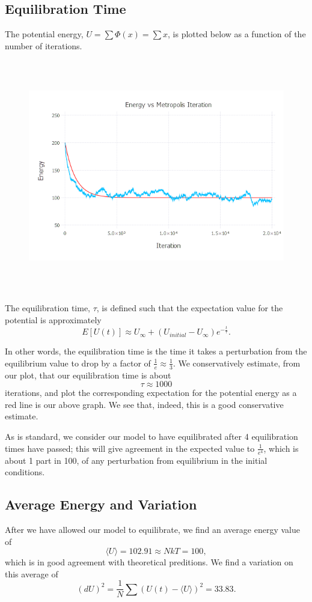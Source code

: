 \documentclass{article}
\begin{document}
\subsection{Equilibration Time}
The potential energy,
$U = \sum\Phi(x) = \sum x$, is plotted below as a function of the number of iterations.
\begin{figure}[H]
	\includegraphics[width=6in,height=4in]{"equilibration"}
\end{figure}

The equilibration time, $\tau$, is defined such that the expectation value for the potential is approximately
$$E[U(t)] \approx U_\infty+(U_{initial} - U_\infty)e^{-\frac{t}{\tau}}.$$

In other words, the equilibration time is the time it takes a perturbation from the equilibrium value to drop by a factor of $\frac{1}{e} \approx \frac{1}{3}$. We conservatively estimate, from our plot, that our equilibration time is about
$$\tau \approx 1000$$
iterations, and plot the corresponding expectation for the potential energy as a red line is our above graph. We see that, indeed, this is a good conservative estimate.

As is standard, we consider our model to have equilibrated after 4 equilibration times have passed; this will give agreement in the expected value to $\frac{1}{e^4}$, which is about 1 part in 100, of any perturbation from equilibrium in the initial conditions.

\subsection{Average Energy and Variation}
After we have allowed our model to equilibrate, we find an average energy value of
$$ \langle U \rangle = 102.91 \approx NkT = 100,$$
which is in good agreement with theoretical preditions. We find a variation on this average of
$$ (dU)^2 = \frac{1}{N}\sum (U(t) - \langle U \rangle)^2 = 33.83 .$$
\end{document}
